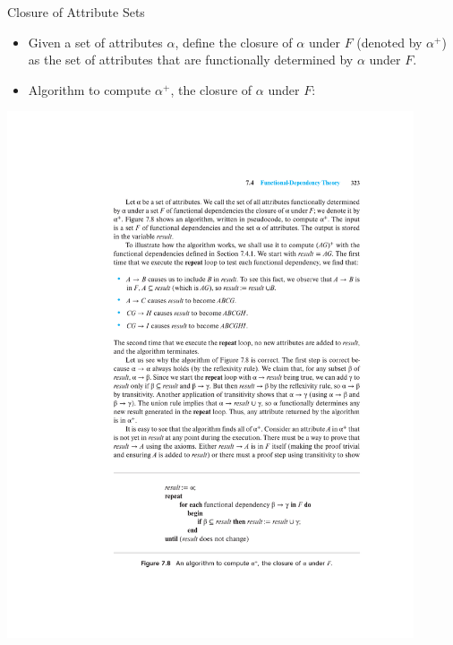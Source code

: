 \documentclass{beamer}
\begin{document}
\begin{frame}{Closure of Attribute Sets}
    \begin{itemize}
        \item Given a set of attributes $\alpha$, define the closure of $\alpha$ under $F$ (denoted by $\alpha^+$) as the set of attributes that are functionally determined by $\alpha$ under $F$.
        \item Algorithm to compute $\alpha^+$, the closure of $\alpha$ under $F$:
    \end{itemize}
    \centering
    \includegraphics[width=0.9\textwidth, trim={6.5cm .75cm 3.5cm 19cm}, clip]{figures/p323_Aplus_procedure}
\end{frame}
\end{document}
